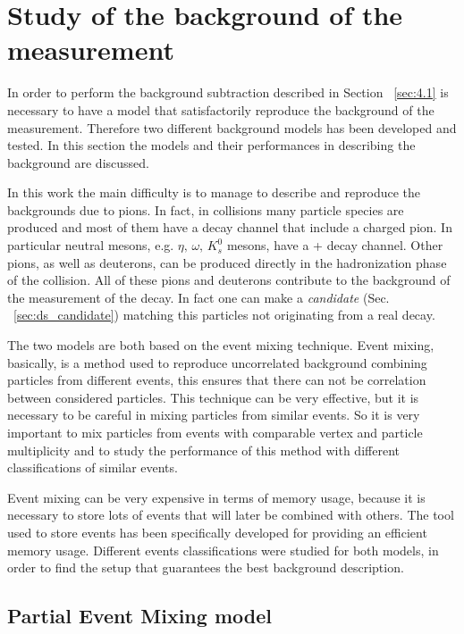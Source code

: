 %
%
\section{Study of the background of the measurement} \label{sec:background}

In order to perform the background subtraction described in Section ~\ref{sec:4.1} is necessary to have
a model that satisfactorily reproduce the background of the measurement. 
Therefore two different background models has been developed and tested. 
In this section the models and their performances in describing the background are discussed.

In this work the main difficulty is to manage to describe and reproduce the backgrounds due to pions.
In fact, in \pPb collisions many particle species are produced \cite{pkp_prod, neutralp, k0s_prod} 
and most of them have a decay channel that include a charged pion.
In particular neutral mesons, e.g. $\eta,\,\omega,\,K_{s}^{0}$ mesons, have a 
\pip + \pim decay channel. Other pions, as well as deuterons, can be produced directly
in the hadronization phase of the collision.
All of these pions and deuterons contribute to the background of the measurement of the
\dstdecay decay. In fact one can make a \textit{\ds candidate} (Sec. ~\ref{sec:ds_candidate})
matching this particles not originating from a real \ds decay.

The two models are both based on the event mixing technique.
Event mixing, basically, is a method used to reproduce uncorrelated background combining particles from
different events, this ensures that there can not be correlation between considered particles.
This technique can be very effective, but it is necessary to be careful in mixing particles from 
similar events.
So it is very important to mix particles from events with comparable vertex and particle multiplicity 
and to study the performance of this method with different classifications of similar events.

Event mixing can be very expensive in terms of memory usage, because it is necessary to store
lots of events that will later be combined with others.
The tool used to store events has been specifically developed for providing an efficient memory usage.
Different events classifications were studied for both models, in order to find the setup that 
guarantees the best background description.

%
\subsection{Partial Event Mixing model} \label{sec:pem}

